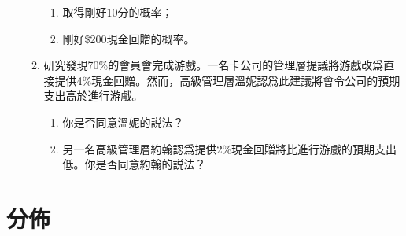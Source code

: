 \documentclass[12pt]{article}
\begin{document}
\begin{enumerate}
\begin{enumerate}
\begin{enumerate}
                \item 取得剛好10分的概率；
                \item 剛好\$200現金回贈的概率。
            \end{enumerate}
            \item 研究發現70\%的會員會完成游戲。一名卡公司的管理層提議將游戲改爲直接提供4\%現金回贈。然而，高級管理層溫妮認爲此建議將會令公司的預期支出高於進行游戲。\begin{enumerate}
                \item 你是否同意溫妮的説法？
                \item 另一名高級管理層約翰認爲提供2\%現金回贈將比進行游戲的預期支出低。你是否同意約翰的説法？
            \end{enumerate}
        \end{enumerate}
    \end{enumerate}

    \section{分佈}
\end{document}
